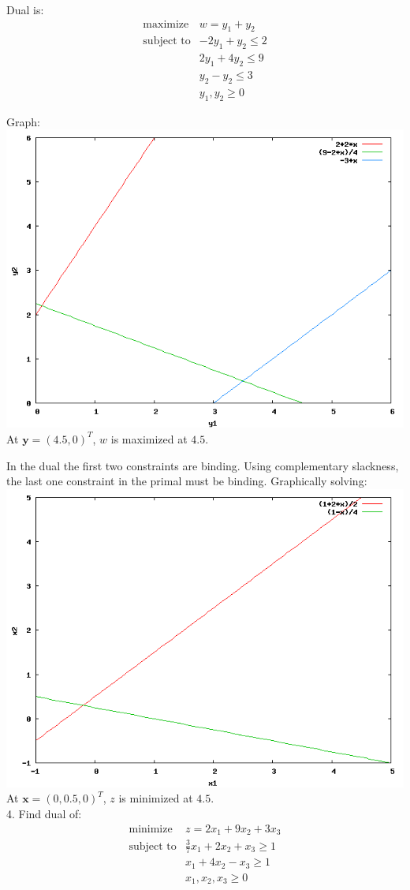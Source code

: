 \documentclass{article}
\begin{document}
Dual is: \\
\begin{displaymath}
\begin{array}{ll}
\textrm{maximize} & w = y_1 + y_2 \\
\textrm{subject to} & -2y_1 + y_2 \le 2 \\
& 2y_1 + 4y_2 \le 9 \\
& y_2 - y_2 \le 3 \\
& y_1, y_2 \ge 0
\end{array}
\end{displaymath}

Graph: \\
\includegraphics[width=0.4\linewidth]{3a} \\
At $\mathbf{y} = (4.5, 0)^T$, $w$ is maximized at $4.5$. \\

\newpage

In the dual the first two constraints are binding. Using complementary slackness, the last one constraint in the primal must be binding. Graphically solving: \\
\includegraphics[width=0.4\linewidth]{3b} \\
At $\mathbf{x} = (0, 0.5, 0)^T$, $z$ is minimized at $4.5$. \\

4. Find dual of: \\
\begin{displaymath}
\begin{array}{ll}
\textrm{minimize} & z = 2x_1 + 9x_2 + 3x_3 \\
\textrm{subject to} & \frac{3}{7}x_1 + 2x_2 + x_3 \ge 1 \\
& x_1 + 4x_2 - x_3 \ge 1 \\
& x_1, x_2, x_3 \ge 0
\end{array}
\end{displaymath}
\end{document}
